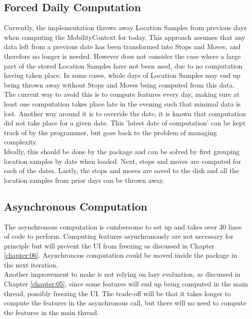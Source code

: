 \subsection{Forced Daily Computation}
Currently, the implementation throws away Location Samples from previous days when computing the MobilityContext for today. This approach assumes that any data left from a previous date has been transformed into Stops and Moves, and therefore no longer is needed. However does not consider the case where a large part of the stored Location Samples have not been used, due to no computation having taken place. In some cases, whole days of Location Samples may end up being thrown away without Stops and Moves being computed from this data.\\

The current way to avoid this is to compute features every day, making sure at least one computation takes place late in the evening such that minimal data is lost. Another way around it is to override the date, it is known that computation did not take place for a given date. This 'latest date of computation' can be kept track of by the programmer, but goes back to the problem of managing complexity. \\

Ideally, this should be done by the package and can be solved by first grouping location samples by date when loaded. Next, stops and moves are computed for each of the dates. Lastly, the stops and moves are saved to the disk and all the location samples from prior days can be thrown away.

\subsection{Asynchronous Computation}
The asynchronous computation is cumbersome to set up and takes over 30 lines of code to perform. Computing features asynchronously are not necessary for principle but will prevent the UI from freezing as discussed in Chapter \ref{chapter:06}. Asynchronous computation could be moved inside the package in the next iteration.\\

Another improvement to make is not relying on lazy evaluation, as discussed in Chapter \ref{chapter:05}, since some features will end up being computed in the main thread, possibly freezing the UI. The trade-off will be that it takes longer to compute the features in the asynchronous call, but there will no need to compute the features in the main thread.

